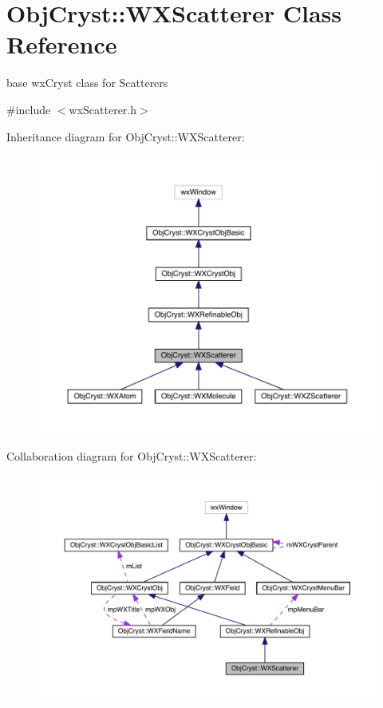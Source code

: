 \hypertarget{class_obj_cryst_1_1_w_x_scatterer}{}\section{Obj\+Cryst\+::W\+X\+Scatterer Class Reference}
\label{class_obj_cryst_1_1_w_x_scatterer}


base wx\+Cryst class for Scatterers  




{\ttfamily \#include $<$wx\+Scatterer.\+h$>$}



Inheritance diagram for Obj\+Cryst\+::W\+X\+Scatterer\+:
\nopagebreak
\begin{figure}[H]
\begin{center}
\leavevmode
\includegraphics[width=350pt]{class_obj_cryst_1_1_w_x_scatterer__inherit__graph}
\end{center}
\end{figure}


Collaboration diagram for Obj\+Cryst\+::W\+X\+Scatterer\+:
\nopagebreak
\begin{figure}[H]
\begin{center}
\leavevmode
\includegraphics[width=350pt]{class_obj_cryst_1_1_w_x_scatterer__coll__graph}
\end{center}
\end{figure}
